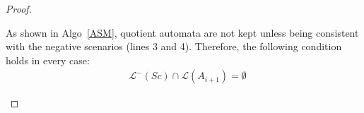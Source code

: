 \begin{theorem}
\begin{proof}
\begin{description}
As shown in Algo~\ref{ASM}, quotient automata are not kept unless being consistent with the negative scenarios (lines 3 and 4). Therefore, the following condition holds in every case:
\begin{align*}
&\mathcal{L}^-(Sc) \cap \mathcal{L}(A_{i+1}) = \emptyset
\end{align*}

\end{description}
\end{proof}
\end{theorem}

